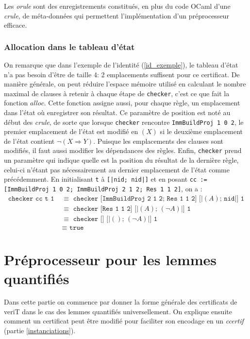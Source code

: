 \documentclass[11pt]{article}
\begin{document}
 Les \textit{orule} sont des enregistrements constitués, en plus du code OCaml d'une \textit{crule}, de méta-données qui permettent l'implémentation d'un préprocesseur efficace.

\subsubsection{Allocation dans le tableau d'état} \label{alloc}

On remarque que dans l'exemple de l'identité (\ref{id_exemple}), le tableau d'état n'a pas besoin d'être de taille 4: 2 emplacements suffisent pour ce certificat. De manière générale, on peut réduire l'espace mémoire utilisé en calculant le nombre maximal de clauses à retenir à chaque étape de \texttt{checker}, c'est ce que fait la fonction $alloc$. Cette fonction assigne aussi, pour chaque règle, un emplacement dans l'état où enregistrer son résultat. Ce paramètre de position est noté au début des \textit{crule}, de sorte que lorsque \texttt{checker} rencontre \texttt{ImmBuildProj 1 0 2}, le premier emplacement de l'état est modifié en $(X)$ si le deuxième emplacement de l'état contient $\neg(X \Rightarrow Y)$. Puisque les emplacements des clauses sont modifiés, il faut aussi modifier les dépendances des règles. Enfin, \texttt{checker} prend un paramètre qui indique quelle est la position du résultat de la dernière règle, celui-ci n'étant pas nécessairement au dernier emplacement de l'état comme précédemment. En initialisant \texttt{t} à \texttt{[|nid; nid|]} et en posant \texttt{cc := [ImmBuildProj 1 0 2; ImmBuildProj 2 1 2; Res 1 1 2]}, on a :
\begin{align*}
  \texttt{checker cc t 1} \,\,&\equiv \,\, \texttt{checker [ImmBuildProj 2 1 2; Res 1 1 2] [|}(A)\texttt{; nid|] 1} \\
    &\equiv \,\,\texttt{checker [Res 1 1 2] [|}(A)\texttt{; }(\neg A)\texttt{|] 1} \\
    &\equiv \,\,\texttt{checker [] [|}()\texttt{; }(\neg A)\texttt{|] 1} \\
    &\equiv \,\,\texttt{true}
\end{align*}


\section{Préprocesseur pour les lemmes quantifiés}

Dans cette partie on commence par donner la forme générale des certificats de veriT dans le cas des lemmes quantifiés universellement. On explique ensuite comment un certificat peut être modifié pour faciliter son encodage en un \textit{ccertif} (partie \ref{instanciations}).\medbreak
\end{document}
